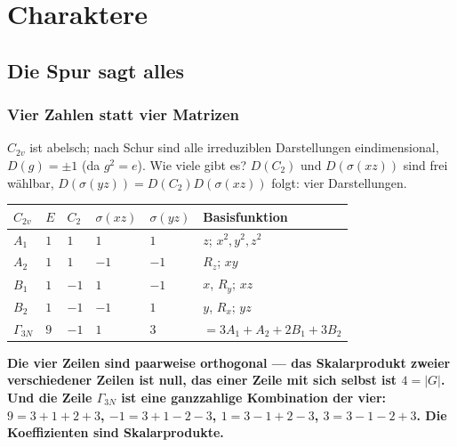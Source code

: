 \part{Charaktere}

\chapter{Die Spur sagt alles}

\section{Vier Zahlen statt vier Matrizen}

\begin{merksatz}
$C_{2v}$ ist abelsch; nach Schur sind alle irreduziblen Darstellungen eindimensional, $D(g) = \pm1$ (da $g^{2} = e$). Wie viele gibt es? $D(C_2)$ und $D(\sigma(xz))$ sind frei wählbar, $D(\sigma(yz)) = D(C_2)D(\sigma(xz))$ folgt: vier Darstellungen.

\begin{center}
{\small
\renewcommand{\arraystretch}{1.46}
\begin{tabular}{@{}P{1.2cm}P{0.8cm}P{0.8cm}P{1.2cm}P{1.2cm}P{3.2cm}@{}}
\toprule
$C_{2v}$ & $E$ & $C_2$ & $\sigma(xz)$ & $\sigma(yz)$ & \textbf{Basisfunktion}\\
\midrule
$A_1$ & $1$ & $1$ & $1$ & $1$ & $z$; $x^{2}, y^{2}, z^{2}$\\
$A_2$ & $1$ & $1$ & $-1$ & $-1$ & $R_z$; $xy$\\
$B_1$ & $1$ & $-1$ & $1$ & $-1$ & $x$, $R_y$; $xz$\\
$B_2$ & $1$ & $-1$ & $-1$ & $1$ & $y$, $R_x$; $yz$\\
\midrule
$\Gamma_{3N}$ & $9$ & $-1$ & $1$ & $3$ & $= 3A_1 + A_2 + 2B_1 + 3B_2$\\
\bottomrule
\end{tabular}}
\end{center}

\begin{center}
\begin{minipage}{0.9\textwidth}
\textbf{Die vier Zeilen sind paarweise orthogonal --- das Skalarprodukt zweier verschiedener Zeilen ist null, das einer Zeile mit sich selbst ist $4 = |G|$. Und die Zeile $\Gamma_{3N}$ ist eine ganzzahlige Kombination der vier: $9 = 3 + 1 + 2 + 3$, $-1 = 3 + 1 - 2 - 3$, $1 = 3 - 1 + 2 - 3$, $3 = 3 - 1 - 2 + 3$. Die Koeffizienten sind Skalarprodukte.}
\end{minipage}
\end{center}


\end{merksatz}
